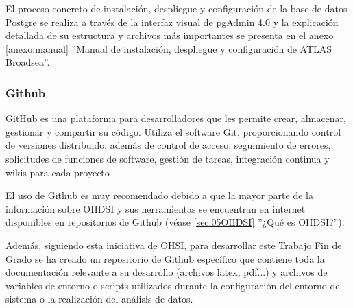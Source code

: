 El proceso concreto de instalación, despliegue y configuración de la base de datos Postgre se realiza a través de la interfaz visual de pgAdmin 4.0 \cite{pgAdminWebsite} y la explicación detallada de su estructura y archivos más importantes se presenta en el anexo \ref{anexo:manual} ''Manual de instalación, despliegue y configuración de ATLAS Broadsea''.

\subsubsection{Github}

GitHub es una plataforma para desarrolladores que les permite crear, almacenar, gestionar y compartir su código. Utiliza el software Git, proporcionando control de versiones distribuido, además de control de acceso, seguimiento de errores, solicitudes de funciones de software, gestión de tareas, integración continua y wikis para cada proyecto \cite{GithubWikipedia}.

El uso de Github es muy recomendado debido a que la mayor parte de la información sobre OHDSI y sus herramientas se encuentran en internet disponibles en repositorios de Github (véase \ref{sec:05OHDSI} ''¿Qué es OHDSI?''). 

Además, siguiendo esta iniciativa de OHSI, para desarrollar este Trabajo Fin de Grado se ha creado un repositorio de Github específico \cite{vallealonsodc} que contiene toda la documentación relevante a su desarrollo (archivos latex, pdf...) y archivos de variables de entorno o scripts utilizados durante la configuración del entorno del sistema o la realización del análisis de datos.   
